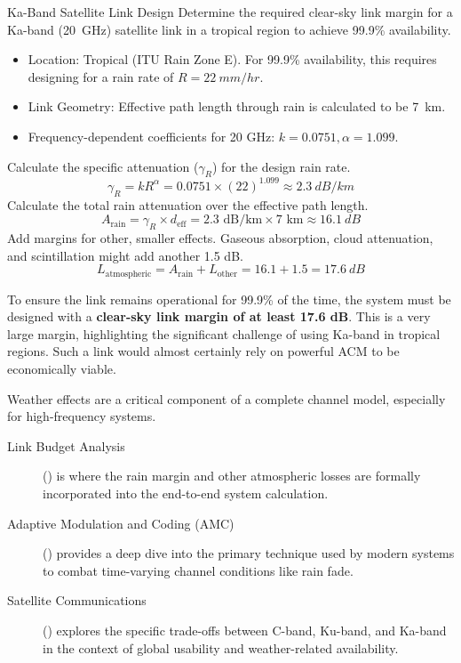 \begin{workedexample}{Ka-Band Satellite Link Design}
     Determine the required clear-sky link margin for a Ka-band (\qty{20}{GHz}) satellite link in a tropical region to achieve 99.9\% availability.
    \begin{itemize}
        \item Location: Tropical (ITU Rain Zone E). For 99.9\% availability, this requires designing for a rain rate of $R = \qty{22}{mm/hr}$.
        \item Link Geometry: Effective path length through rain is calculated to be \qty{7}{km}.
        \item Frequency-dependent coefficients for 20 GHz: $k=0.0751, \alpha=1.099$.
    \end{itemize}
    \begin{derivationsteps}
        \step Calculate the specific attenuation ($\gamma_R$) for the design rain rate.
        \[ \gamma_R = k R^{\alpha} = 0.0751 \times (22)^{1.099} \approx \qty{2.3}{dB/km} \]
        \step Calculate the total rain attenuation over the effective path length.
        \[ A_{\text{rain}} = \gamma_R \times d_{\text{eff}} = 2.3 \text{ dB/km} \times 7 \text{ km} \approx \qty{16.1}{dB} \]
        \step Add margins for other, smaller effects. Gaseous absorption, cloud attenuation, and scintillation might add another 1.5 dB.
        \[ L_{\text{atmospheric}} = A_{\text{rain}} + L_{\text{other}} = 16.1 + 1.5 = \qty{17.6}{dB} \]
    \end{derivationsteps}
     To ensure the link remains operational for 99.9\% of the time, the system must be designed with a \textbf{clear-sky link margin of at least 17.6 dB}. This is a very large margin, highlighting the significant challenge of using Ka-band in tropical regions. Such a link would almost certainly rely on powerful ACM to be economically viable.
\end{workedexample}


\begin{importantbox}[title={Further Reading}]
    Weather effects are a critical component of a complete channel model, especially for high-frequency systems.
    \begin{description}
        \item[Link Budget Analysis] () is where the rain margin and other atmospheric losses are formally incorporated into the end-to-end system calculation.
        \item[Adaptive Modulation and Coding (AMC)] () provides a deep dive into the primary technique used by modern systems to combat time-varying channel conditions like rain fade.
        \item[Satellite Communications] () explores the specific trade-offs between C-band, Ku-band, and Ka-band in the context of global usability and weather-related availability.
    \end{description}
\end{importantbox}